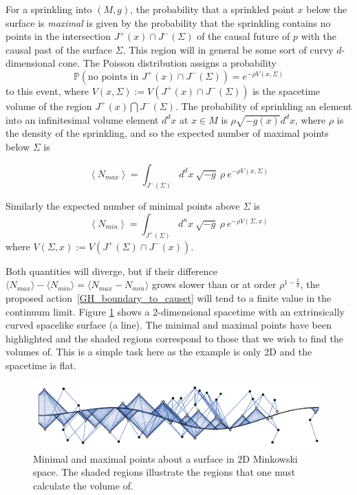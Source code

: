 \documentclass[12pt]{article}
\newcommand{\be}{\begin{equation}}
\newcommand{\ee}{\end{equation}}
\begin{document}
For a sprinkling into $(M,g)$, the probability that a sprinkled point $x$ below the surface is \emph{maximal} is given by the probability that the sprinkling contains no points in the intersection $J^{+}(x)\cap J^{-}(\Sigma)$ of the causal future of $p$ with the causal past of the surface $\Sigma$. This region will in general be some sort of curvy $d$-dimensional cone. The Poisson distribution assigns a probability
\be\label{Poisson}
\mathbb P\left(\text{no points in }J^{+}(x)\cap J^{-}(\Sigma)\right)=e^{-\rho V(x,\Sigma)}
\ee
to this event, where $V(x,\Sigma):=V(J^{+}(x)\cap J^{-}(\Sigma))$ is the spacetime volume of the region $J^{+}(x)\bigcap J^{-}(\Sigma)$. The probability of sprinkling an element into an infinitesimal volume element $d^dx$ at $x\in M$ is $\rho\sqrt{-g(x)}d^dx$, where $\rho$ is the density of the sprinkling, and so the expected number of maximal points below $\Sigma$ is

\be\label{eq:nmax}
\left\langle N_{max}\right\rangle =\int_{J^{-}(\Sigma)}d^{d}x\:\sqrt{-g}\ \rho\ e^{-\rho V(x,\Sigma)}
\ee

Similarly the expected number of minimal points above $\Sigma$ is
\be\label{eq:nmin}
\left\langle N_{min}\right\rangle =\int_{J^{+}(\Sigma)}d^{n}x\:\sqrt{-g}\ \rho\ e^{-\rho V(\Sigma,x)}
\ee
where $V(\Sigma,x):=V(J^{+}(\Sigma)\cap J^{-}(x))$.

Both quantities will diverge, but if their difference $\langle N_{max}\rangle - \langle N_{min}\rangle = \langle N_{max} - N_{min}\rangle$ grows slower than or at order $\rho^{1-\frac2d}$, the proposed action~\eqref{GH_boundary_to_causet} will tend to a finite value in the continuum limit.  Figure \ref{fig:Nmin_Nmax} shows a 2-dimensional spacetime with an extrinsically curved spacelike surface (a line). The minimal and maximal points have been highlighted and the shaded regions correspond to those that  we wish to find the volumes of. This is a simple task here as the example is only 2D and the spacetime is flat.

\begin{figure}
  \centering
    \includegraphics[width=\textwidth]{minmaxplot}
     \caption{Minimal and maximal points about a surface in 2D Minkowski space. The shaded regions illustrate the regions that one must calculate the volume of.}
     \label{fig:Nmin_Nmax}
\end{figure}
\end{document}
